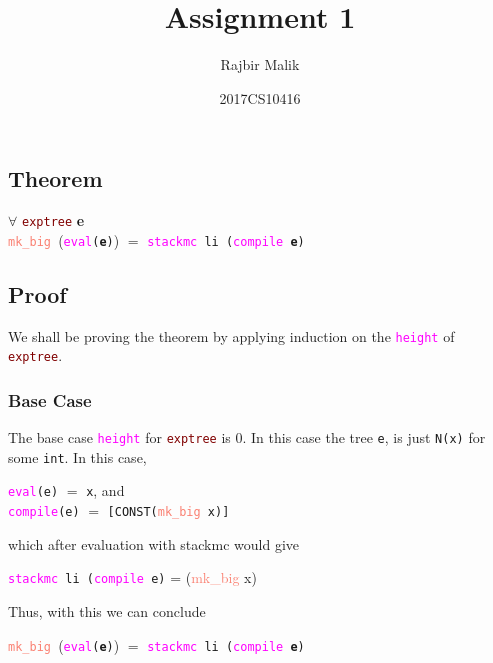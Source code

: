 \documentclass{article}
\title{Assignment 1}
\author{Rajbir Malik}
\date{2017CS10416}
\begin{document}
\maketitle
\subsection*{Theorem}

\begin{center}
\(\forall\) \texttt{\textcolor{Maroon}{exptree}} \textbf{e} \\[5pt] \texttt{\textcolor{Salmon}{mk\_big} }(\texttt{\textcolor{Fuchsia}{eval}(\textbf{e})}) \(=\) \texttt{\textcolor{Fuchsia}{stackmc} li (\textcolor{Fuchsia}{compile} \textbf{e})} \\
\end{center}

\subsection*{Proof}
We shall be proving the theorem by applying induction on the \texttt{\textcolor{Fuchsia}{height}} of \texttt{\textcolor{Maroon}{exptree}}. \\
\subsubsection*{Base Case}
The base case \texttt{\textcolor{Fuchsia}{height}} for \texttt{\textcolor{Maroon}{exptree}} is 0. In this case the tree \texttt{e}, is just \texttt{N(x)} for some \texttt{int}.
In this case,
\begin{center}
    \texttt{\textcolor{Fuchsia}{eval}(e)} \(=\) \texttt{x}, and\\[5pt]
    \texttt{\textcolor{Fuchsia}{compile}(e)} \(=\) \texttt{[CONST(\textcolor{Salmon}{mk\_big} x)]} \\
\end{center}
    which after evaluation with stackmc would give
\begin{center}
    \texttt{\textcolor{Fuchsia}{stackmc} li (\textcolor{Fuchsia}{compile} e)} = (\textcolor{Salmon}{mk\_big} x)
\end{center}
Thus, with this we can conclude
\begin{center}
    \texttt{\textcolor{Salmon}{mk\_big} }(\texttt{\textcolor{Fuchsia}{eval}(\textbf{e})}) \(=\) \texttt{\textcolor{Fuchsia}{stackmc} li (\textcolor{Fuchsia}{compile} \textbf{e})}
\end{center}
\phantom \\
\end{document}
